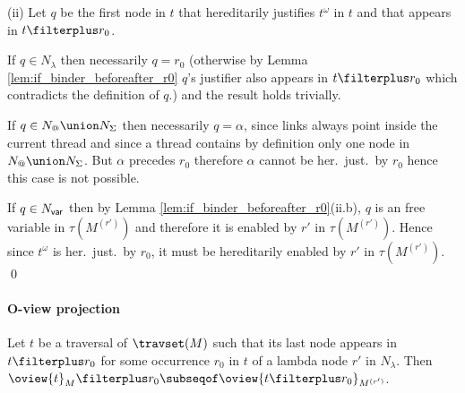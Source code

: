 (ii)
Let $q$ be the first node in $t$ that hereditarily justifies
$t^\omega$ in $t$ and that appears in $t\filterplus r_0$.


If $q \in N_\lambda$ then necessarily $q = r_0$
(otherwise by Lemma \ref{lem:if_binder_beforeafter_r0}
$q$'s justifier also appears in $t\filterplus r_0$ which contradicts
the definition of $q$.) and the result holds trivially.

If $q\in N_@\union N_\Sigma$ then necessarily $q=\alpha$, since
links always point inside the current thread and since a thread contains by definition only one node in $N_@\union N_\Sigma$. But $\alpha$ precedes $r_0$ therefore $\alpha$ cannot be her.\ just.\ by $r_0$ hence this case is not possible.

If $q \in N_{\sf var}$ then by Lemma \ref{lem:if_binder_beforeafter_r0}(ii.b),
$q$ is an free variable in $\tau(M^{(r')})$ and therefore
it is enabled by $r'$ in $\tau(M^{(r')})$. Hence since $t^\omega$ is her.\ just.\ by $r_0$, it must be hereditarily enabled
by $r'$ in $\tau(M^{(r')})$. \qed

\paragraph{O-view projection}

\begin{proposition}
\label{prop:oview_trav_projection}
   Let $t$ be a traversal of $\travset(M)$ such that its last node
   appears in $t \filterplus r_0$ for some occurrence $r_0$ in $t$ of a lambda node $r'$ in $N_\lambda$.
   Then $ \oview{t}_M\filterplus r_0 \subseqof \oview{t\filterplus r_0}_{M^{(r')}}$.
\end{proposition}

